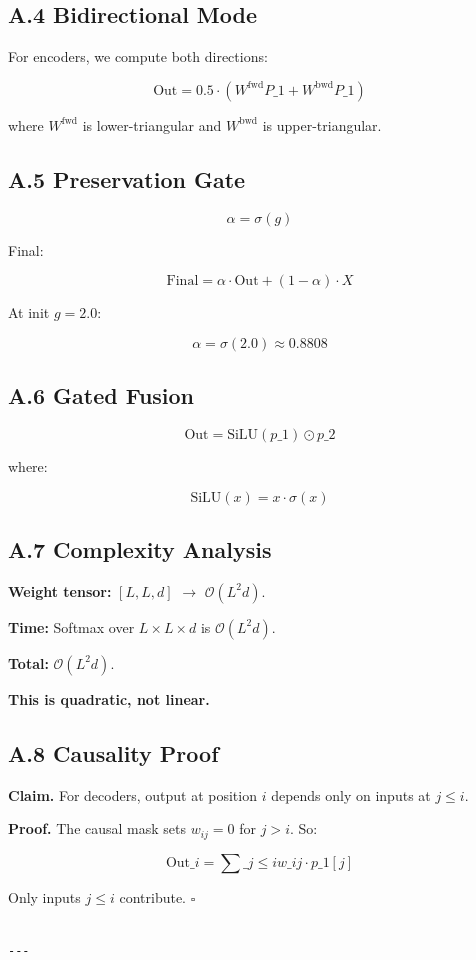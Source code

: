 \subsection{A.4 Bidirectional Mode}

For encoders, we compute both directions:

\[
\text{Out} = 0.5 \cdot (W^\text{fwd} P\_1 + W^\text{bwd} P\_1)
\tag{A.6}
\]

where $W^\text{fwd}$ is lower-triangular and $W^\text{bwd}$ is upper-triangular.

\subsection{A.5 Preservation Gate}

\[
\alpha = \sigma(g)
\tag{A.7}
\]

Final:

\[
\text{Final} = \alpha \cdot \text{Out} + (1 - \alpha) \cdot X
\tag{A.8}
\]

At init $g = 2.0$:

\[
\alpha = \sigma(2.0) \approx 0.8808
\tag{A.9}
\]

\subsection{A.6 Gated Fusion}

\[
\text{Out} = \text{SiLU}(p\_1) \odot p\_2
\tag{A.10}
\]

where:

\[
\text{SiLU}(x) = x \cdot \sigma(x)
\tag{A.11}
\]

\subsection{A.7 Complexity Analysis}

\textbf{Weight tensor:} $[L, L, d]$ $\to$ $\mathcal{O}(L^2 d)$.

\textbf{Time:} Softmax over $L \times L \times d$ is $\mathcal{O}(L^2 d)$.

\textbf{Total:} $\mathcal{O}(L^2 d)$.

\textbf{This is quadratic, not linear.}

\subsection{A.8 Causality Proof}

\textbf{Claim.} For decoders, output at position $i$ depends only on inputs at 
$j \leq i$.

\textbf{Proof.} The causal mask sets $w_{ij} = 0$ for $j > i$. So:

\[
\text{Out}\_i = \sum\_{j \leq i} w\_{ij} \cdot p\_1[j]
\tag{A.12}
\]

Only inputs $j \leq i$ contribute. $\square$
\begin{lstlisting}

---
\end{lstlisting}
